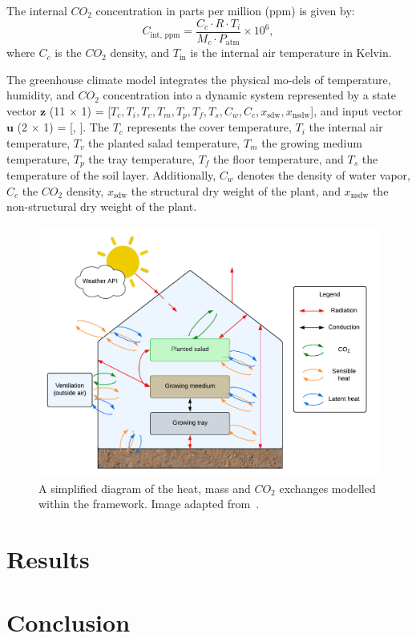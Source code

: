 \documentclass[conference]{IEEEtran}
\begin{document}
The internal $CO_2$ concentration in parts per million (ppm) is given by:
\begin{equation}
    C_{\text{int, ppm}} = \frac{C_c \cdot R \cdot T_i}{M_c \cdot P_{\text{atm}}} \times 10^6,
\end{equation}
where $C_c$ is the $CO_2$ density, and $T_{\text{in}}$ is the internal air temperature in Kelvin.

The greenhouse climate model integrates the physical mo-dels of temperature, humidity, and $CO_2$ concentration into a dynamic system represented by a state vector $\mathbf{z}$ (11 $\times$ 1) = [$T_c, T_i, T_v, T_m, T_p, T_f, T_s, C_w, C_c, x_{\text{sdw}}, x_{\text{nsdw}}$], and input vector $\mathbf{u}$ (2 $\times$ 1) = [, ]. The $T_c$ represents the cover temperature, $T_i$ the internal air temperature, $T_v$ the planted salad temperature, $T_m$ the growing medium temperature, $T_p$ the tray temperature, $T_f$ the floor temperature, and $T_s$ the temperature of the soil layer. Additionally, $C_w$ denotes the density of water vapor, $C_c$ the $CO_2$ density, $x_{\text{sdw}}$ the structural dry weight of the plant, and $x_{\text{nsdw}}$ the non-structural dry weight of the plant.

\begin{figure}
    \centering
    \includegraphics[width=.5\textwidth]{images/diagram.pdf}
    \caption{A simplified diagram of the heat, mass and $CO_2$ exchanges modelled within the framework. Image adapted from~\cite{rmward61_2019}.}
    \label{fig:diagram}
\end{figure}

\section{Results}

\section{Conclusion}



\end{document}
